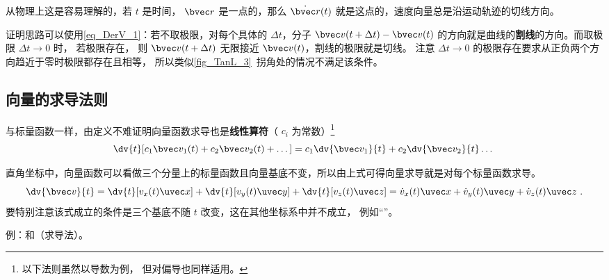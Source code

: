 从物理上这是容易理解的，若 $t$ 是时间， $\bvec r$ 是一点的，那么 $\dot{\bvec r}(t)$ 就是这点的，速度向量总是沿运动轨迹的切线方向。

证明思路可以使用\autoref{eq_DerV_1}：若不取极限，对每个具体的 $\Delta t$，分子 $\bvec v(t+\Delta t)-\bvec v(t)$ 的方向就是曲线的\textbf{割线}的方向。而取极限 $\Delta t\to 0$ 时， 若极限存在， 则 $\bvec v(t+\Delta t)$ 无限接近 $\bvec v(t)$，割线的极限就是切线。 注意 $\Delta t\to 0$ 的极限存在要求从正负两个方向趋近于零时极限都存在且相等， 所以类似\autoref{fig_TanL_3}~拐角处的情况不满足该条件。

\subsection{向量的求导法则}
与标量函数一样，由定义不难证明向量函数求导也是\textbf{线性算符}（ $c_i$ 为常数）\footnote{以下法则虽然以导数为例， 但对偏导也同样适用。}
\begin{equation}
\dv{t}[c_1 \bvec v_1(t) + c_2 \bvec v_2(t) + \dots] = c_1\dv{\bvec v_1}{t} + c_2\dv{\bvec v_2}{t} \dots~
\end{equation}

直角坐标中，向量函数可以看做三个分量上的标量函数且向量基底不变，所以由上式可得向量求导就是对每个标量函数求导。
\begin{equation}\label{eq_DerV_2}
\dv{\bvec v}{t} = \dv{t}[v_x(t)\uvec x] + \dv{t}[v_y(t)\uvec y] + \dv{t}[v_z(t)\uvec z]
= \dot v_x(t)\uvec x + \dot v_y(t)\uvec y + \dot v_z(t)\uvec z~.
\end{equation}
要特别注意该式成立的条件是三个基底不随 $t$ 改变，这在其他坐标系中并不成立， 例如“”。

例：和（求导法）。

